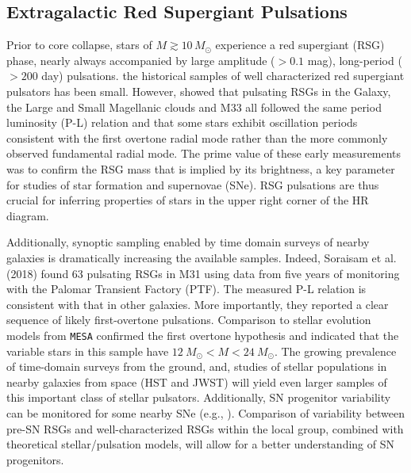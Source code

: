 \subsection{Extragalactic Red Supergiant Pulsations}

Prior to core collapse, stars of $M \! \gtrsim \! 10 \, M_\odot$ experience a red
supergiant (RSG) phase, nearly always accompanied by large amplitude
($>0.1$ mag), long-period ($>200 $ day) pulsations.  
the historical samples of well
characterized red supergiant pulsators has been small. However, \citet{Yang_2012} showed that pulsating RSGs in the Galaxy, the Large and Small Magellanic clouds and M33 all followed the
same period luminosity (P-L) relation and that some stars exhibit
oscillation periods consistent with the first overtone radial mode
rather than the more commonly observed fundamental radial mode. The
prime value of these early measurements was to confirm the RSG mass
that is implied by its brightness, a key parameter for studies of star
formation and supernovae (SNe). RSG pulsations are thus crucial for inferring properties of stars in the upper right corner of the HR diagram.

Additionally, synoptic sampling enabled by time domain surveys of
nearby galaxies is dramatically increasing the available samples. Indeed, Soraisam et al. (2018) found 63 pulsating RSGs in M31 using data from five years of
monitoring with the Palomar Transient Factory (PTF). The measured P-L
relation is consistent with that in other galaxies. 
{\color{green} More importantly, they reported a clear sequence of likely first-overtone
pulsations. Comparison to stellar evolution models from \texttt{MESA}
confirmed the first overtone hypothesis and indicated that} the
variable stars in this sample have $12~M_{\odot} \! < \! M \! < \! 24~M_{\odot}$. The growing prevalence of time-domain surveys from the ground, and, studies 
of stellar populations in nearby galaxies from space (HST and JWST) 
will yield even larger samples of this important class of stellar pulsators. Additionally, SN progenitor variability can be monitored for some nearby SNe (e.g., \citealt{kochanek:17}). Comparison of variability between pre-SN RSGs and well-characterized RSGs within the local group, combined with theoretical stellar/pulsation models, will allow for a better understanding of SN progenitors.